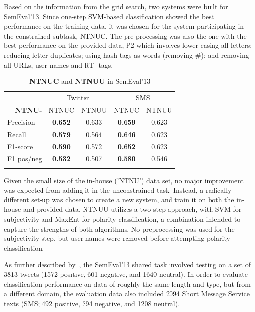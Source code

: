 Based on the information from the grid search, two systems were built for SemEval'13. Since one-step SVM-based classification showed the best performance on the training data, it was chosen for the system participating in the constrained subtask, NTNUC. The pre-processing was also the one with the best performance on the provided data, P2 which involves lower-casing all letters; reducing letter duplicates; using hash-tags as words (removing \#); and removing all URLs, user names and RT -tags.

\begin{table}[t!]

\centering
\begin{tabular}{l|cc|cc} 
\noalign{\smallskip}\hline\noalign{\smallskip}
	& \multicolumn{2}{c|}{Twitter}	& \multicolumn{2}{c}{SMS} \\
 \multicolumn{1}{r|}{\bf NTNU-}	&  {\footnotesize NTNUC}	& {\footnotesize NTNUU}	& {\footnotesize NTNUC}	& {\footnotesize NTNUU} \\
\noalign{\smallskip}\hline\noalign{\smallskip}
Precision    				& {\bf 0.652}	& 0.633 	& {\bf 0.659} 	& 0.623 \\
Recall       				& {\bf 0.579}  	& 0.564 	& {\bf 0.646} 	& 0.623  \\
F1-score  				& {\bf 0.590}  	& 0.572 	& {\bf 0.652} 	& 0.623  \\
F1 pos/neg 				& {\bf 0.532}  	& 0.507 	& {\bf 0.580} 	& 0.546  \\
\noalign{\smallskip}\hline\noalign{\smallskip}
\end{tabular}

\caption{{\bf NTNUC} and {\bf NTNUU} in SemEval'13}
\label{tab:semeval_results}
\end{table}

Given the small size of the in-house ('NTNU') data set, no major improvement was expected from adding it in the unconstrained task. Instead, a radically different set-up was chosen to create a new system, and train it on both the in-house and provided data. NTNUU utilizes a two-step approach, with SVM for subjectivity and MaxEnt for polarity classification, a combination intended to capture the strengths of both algorithms. No preprocessing was used for the subjectivity step, but user names were removed before attempting polarity classification.

As further described by~\citet{WilsonEA:13}, the SemEval'13 shared task involved testing on a set of 3813 tweets (1572 positive, 601 negative, and 1640 neutral). In order to evaluate classification performance on data of roughly the same length and type, but from a different domain, the evaluation data also included 2094 Short Message Service texts (SMS; 492 positive, 394 negative, and 1208 neutral).

